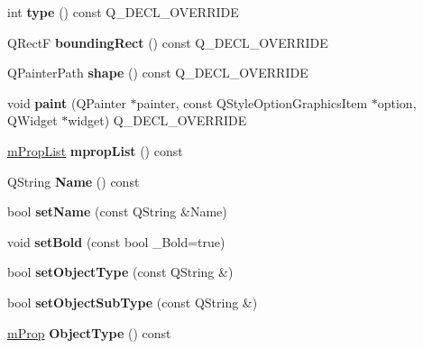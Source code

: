 \begin{DoxyCompactItemize}
\mbox{\label{class_node_a5ff23cc2756595673d0379f19b9a0de9}} 
int {\bfseries type} () const Q\+\_\+\+D\+E\+C\+L\+\_\+\+O\+V\+E\+R\+R\+I\+DE
\item 
\mbox{\label{class_node_a91b9aa621ce72fd974ab972ffeb6ec52}} 
Q\+RectF {\bfseries bounding\+Rect} () const Q\+\_\+\+D\+E\+C\+L\+\_\+\+O\+V\+E\+R\+R\+I\+DE
\item 
\mbox{\label{class_node_aa1a523740f6a0694abbe690e07eb1d36}} 
Q\+Painter\+Path {\bfseries shape} () const Q\+\_\+\+D\+E\+C\+L\+\_\+\+O\+V\+E\+R\+R\+I\+DE
\item 
\mbox{\label{class_node_afa10e3bbea7f308c3eddcc6097748d13}} 
void {\bfseries paint} (Q\+Painter $\ast$painter, const Q\+Style\+Option\+Graphics\+Item $\ast$option, Q\+Widget $\ast$widget) Q\+\_\+\+D\+E\+C\+L\+\_\+\+O\+V\+E\+R\+R\+I\+DE
\item 
\mbox{\label{class_node_ad6d5827aeaed23cc7889a54d3b75835f}} 
\hyperlink{classm_prop_list}{m\+Prop\+List} {\bfseries mprop\+List} () const
\item 
\mbox{\label{class_node_ae1a9b6aa1fd2700ab1d4e67461b7973f}} 
Q\+String {\bfseries Name} () const
\item 
\mbox{\label{class_node_a39dcb26df3972052abd391c10b724df3}} 
bool {\bfseries set\+Name} (const Q\+String \&Name)
\item 
\mbox{\label{class_node_a6ade75c93fb3fbde74cff92f5efcdeb4}} 
void {\bfseries set\+Bold} (const bool \+\_\+\+Bold=true)
\item 
\mbox{\label{class_node_a5dbe9d4db8f76987f5d1dcdf9a86daef}} 
bool {\bfseries set\+Object\+Type} (const Q\+String \&)
\item 
\mbox{\label{class_node_ae48f6d68f5f4364aea64449a85fa45f2}} 
bool {\bfseries set\+Object\+Sub\+Type} (const Q\+String \&)
\item 
\mbox{\label{class_node_aa3489a9f7a6fadde097cf605dd6cafbc}} 
\hyperlink{classm_prop}{m\+Prop} {\bfseries Object\+Type} () const

\end{DoxyCompactItemize}
